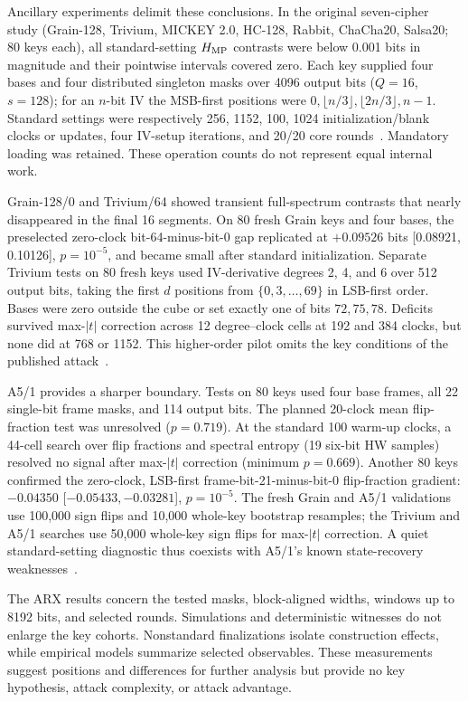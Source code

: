 \documentclass[electronics,article,submit,pdftex,oneauthor]{Definitions/mdpi}
\begin{document}
Ancillary experiments delimit these conclusions. In the original seven-cipher study (Grain-128, Trivium, MICKEY 2.0, HC-128, Rabbit, ChaCha20, Salsa20; 80 keys each), all standard-setting $H_{\rm MP}$ contrasts were below 0.001 bits in magnitude and their pointwise intervals covered zero. Each key supplied four bases and four distributed singleton masks over 4096 output bits ($Q=16$, $s=128$); for an $n$-bit IV the MSB-first positions were $0,\lfloor n/3\rfloor,\lfloor2n/3\rfloor,n-1$. Standard settings were respectively 256, 1152, 100, 1024 initialization/blank clocks or updates, four IV-setup iterations, and 20/20 core rounds~\citep{grain2006,trivium2006,estream2008}. Mandatory loading was retained. These operation counts do not represent equal internal work.

Grain-128/0 and Trivium/64 showed transient full-spectrum contrasts that nearly disappeared in the final 16 segments. On 80 fresh Grain keys and four bases, the preselected zero-clock bit-64-minus-bit-0 gap replicated at $+0.09526$ bits [0.08921, 0.10126], $p=10^{-5}$, and became small after standard initialization. Separate Trivium tests on 80 fresh keys used IV-derivative degrees 2, 4, and 6 over 512 output bits, taking the first $d$ positions from $\{0,3,\ldots,69\}$ in LSB-first order. Bases were zero outside the cube or set exactly one of bits $72,75,78$. Deficits survived max-$|t|$ correction across 12 degree--clock cells at 192 and 384 clocks, but none did at 768 or 1152. This higher-order pilot omits the key conditions of the published attack~\citep{knellwolf2011}.

A5/1 provides a sharper boundary. Tests on 80 keys used four base frames, all 22 single-bit frame masks, and 114 output bits. The planned 20-clock mean flip-fraction test was unresolved ($p=0.719$). At the standard 100 warm-up clocks, a 44-cell search over flip fractions and spectral entropy (19 six-bit HW samples) resolved no signal after max-$|t|$ correction (minimum $p=0.669$). Another 80 keys confirmed the zero-clock, LSB-first frame-bit-21-minus-bit-0 flip-fraction gradient: $-0.04350$ [$-0.05433,-0.03281$], $p=10^{-5}$. The fresh Grain and A5/1 validations use 100,000 sign flips and 10,000 whole-key bootstrap resamples; the Trivium and A5/1 searches use 50,000 whole-key sign flips for max-$|t|$ correction. A quiet standard-setting diagnostic thus coexists with A5/1's known state-recovery weaknesses~\citep{biryukov2000}.

The ARX results concern the tested masks, block-aligned widths, windows up to 8192 bits, and selected rounds. Simulations and deterministic witnesses do not enlarge the key cohorts. Nonstandard finalizations isolate construction effects, while empirical models summarize selected observables. These measurements suggest positions and differences for further analysis but provide no key hypothesis, attack complexity, or attack advantage.
\end{document}
